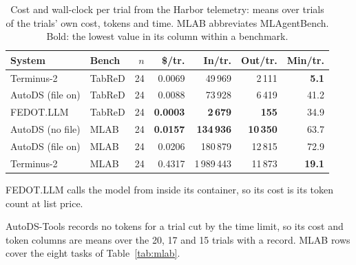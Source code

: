 \begin{table}[!t]
\centering
\caption{Cost and wall-clock per trial from the Harbor telemetry: means over trials of the trials' own cost, tokens and time. MLAB abbreviates MLAgentBench. Bold: the lowest value in its column within a benchmark.}
\label{tab:cost}
\footnotesize
\setlength{\tabcolsep}{2pt}
\begin{tabular}{llrrrrr}
\toprule
System & Bench & $n$ & \$/tr. & In/tr. & Out/tr. & Min/tr. \\
\midrule
Terminus-2 & TabReD & 24 & 0.0069 & 49\,969 & 2\,111 & \textbf{5.1} \\
AutoDS (file on) & TabReD & 24 & 0.0088 & 73\,928 & 6\,419 & 41.2 \\
FEDOT.LLM & TabReD & 24 & \textbf{0.0003} & \textbf{2\,679} & \textbf{155} & 34.9 \\
AutoDS (no file) & MLAB & 24 & \textbf{0.0157} & \textbf{134\,936} & \textbf{10\,350} & 63.7 \\
AutoDS (file on) & MLAB & 24 & 0.0206 & 180\,879 & 12\,815 & 72.9 \\
Terminus-2 & MLAB & 24 & 0.4317 & 1\,989\,443 & 11\,873 & \textbf{19.1} \\
\bottomrule
\end{tabular}
\begin{tablenotes}\footnotesize
\item FEDOT.LLM calls the model from inside its container, so its cost is its token count at list price.
\item AutoDS-Tools records no tokens for a trial cut by the time limit, so its cost and token columns are means over the 20, 17 and 15 trials with a record. MLAB rows cover the eight tasks of Table~\ref{tab:mlab}.
\end{tablenotes}
\end{table}
